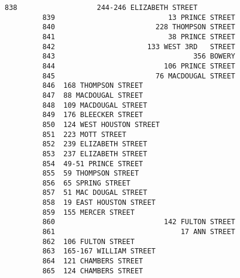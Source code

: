 \documentclass[11pt]{article}
\begin{document}
\begin{Verbatim}[commandchars=\\\{\}]
         838                   244-246 ELIZABETH STREET                    
         839                           13 PRINCE STREET                    
         840                        228 THOMPSON STREET                    
         841                           38 PRINCE STREET                    
         842                      133 WEST 3RD   STREET                    
         843                                 356 BOWERY                    
         844                          106 PRINCE STREET                    
         845                        76 MACDOUGAL STREET                    
         846  168 THOMPSON STREET                                          
         847  88 MACDOUGAL STREET                                          
         848  109 MACDOUGAL STREET                                         
         849  176 BLEECKER STREET                                          
         850  124 WEST HOUSTON STREET                                      
         851  223 MOTT STREET                                              
         852  239 ELIZABETH STREET                                         
         853  237 ELIZABETH STREET                                         
         854  49-51 PRINCE STREET                                          
         855  59 THOMPSON STREET                                           
         856  65 SPRING STREET                                             
         857  51 MAC DOUGAL STREET                                         
         858  19 EAST HOUSTON STREET                                       
         859  155 MERCER STREET                                            
         860                          142 FULTON STREET                    
         861                              17 ANN STREET                    
         862  106 FULTON STREET                                            
         863  165-167 WILLIAM STREET                                       
         864  121 CHAMBERS STREET                                          
         865  124 CHAMBERS STREET                                          
         

\end{Verbatim}
\end{document}
